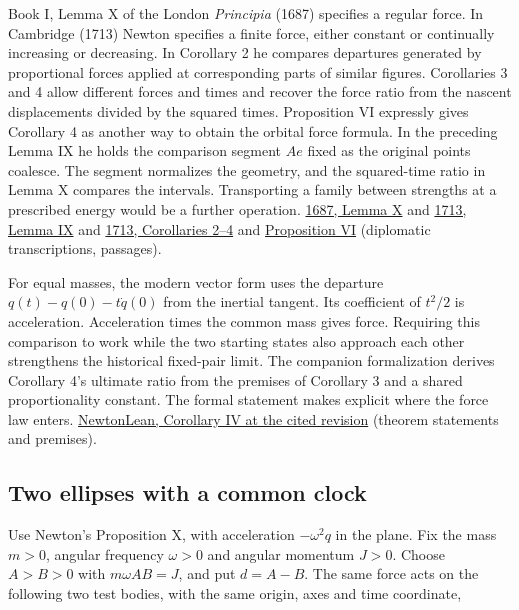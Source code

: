 \documentclass[11pt,a4paper]{article}
\begin{document}
Book I, Lemma X of the London \emph{Principia} (1687) specifies a
regular force. In Cambridge (1713) Newton specifies a finite force,
either constant or continually increasing or decreasing. In Corollary 2
he compares departures generated by proportional forces applied at
corresponding parts of similar figures. Corollaries 3 and 4 allow
different forces and times and recover the force ratio from the nascent
displacements divided by the squared times. Proposition VI expressly
gives Corollary 4 as another way to obtain the orbital force formula. In
the preceding Lemma IX he holds the comparison segment \(Ae\) fixed as
the original points coalesce. The segment normalizes the geometry, and
the squared-time ratio in Lemma X compares the intervals. Transporting a
family between strengths at a prescribed energy would be a further
operation.
\href{https://www.newtonproject.ox.ac.uk/view/texts/diplomatic/NATP00077\#par27}{1687,
Lemma X} and
\href{https://www.newtonproject.ox.ac.uk/view/texts/diplomatic/NATP00082\#par27}{1713,
Lemma IX} and
\href{https://www.newtonproject.ox.ac.uk/view/texts/diplomatic/NATP00082\#par31}{1713,
Corollaries 2--4} and
\href{https://www.newtonproject.ox.ac.uk/view/texts/diplomatic/NATP00082\#par90}{Proposition
VI} (diplomatic transcriptions, passages).

For equal masses, the modern vector form uses the departure
\(q(t)-q(0)-t\dot q(0)\) from the inertial tangent. Its coefficient of
\(t^2/2\) is acceleration. Acceleration times the common mass gives
force. Requiring this comparison to work while the two starting states
also approach each other strengthens the historical fixed-pair limit.
The companion formalization derives Corollary 4's ultimate ratio from
the premises of Corollary 3 and a shared proportionality constant. The
formal statement makes explicit where the force law enters.
\href{https://github.com/arivero/newtonlean/blob/8138e9449b4f961c4adbebcb6090acc0d2fd5aaf/NewtonLimitDynamics/Historical/LemmaX/CorollaryIV.lean}{NewtonLean,
Corollary IV at the cited revision} (theorem statements and premises).

\subsection{Two ellipses with a common
clock}\label{two-ellipses-with-a-common-clock}

Use Newton's Proposition X, with acceleration \(-\omega^2q\) in the
plane. Fix the mass \(m>0\), angular frequency \(\omega>0\) and angular
momentum \(J>0\). Choose \(A>B>0\) with \(m\omega AB=J\), and put
\(d=A-B\). The same force acts on the following two test bodies, with
the same origin, axes and time coordinate,
\end{document}
